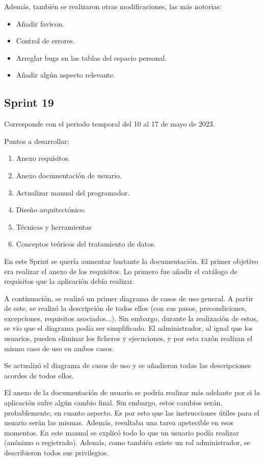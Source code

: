 Además, también se realizaron otras modificaciones, las más notorias:
\begin{itemize}
    \item Añadir favicon.
    \item Control de errores.
    \item Arreglar bugs en las tablas del espacio personal.
    \item Añadir algún aspecto relevante.
\end{itemize}


\subsection{Sprint 19}
Corresponde con el periodo temporal del 10 al 17 de mayo de 2023.

Puntos a desarrollar:
\begin{enumerate}
    \item Anexo requisitos.
    \item Anexo documentación de usuario.
    \item Actualizar manual del programador.
    \item Diseño arquitectónico.
    \item Técnicas y herramientas
    \item Conceptos teóricos del tratamiento de datos.
\end{enumerate}

En este Sprint se quería aumentar bastante la documentación. El primer objetivo
era realizar el anexo de los requisitos. Lo primero fue añadir el catálogo de
requisitos que la aplicación debía realizar.

A continuación, se realizó un primer diagrama de casos de uso general. A partir
de este, se realizó la descripción de todos ellos (con sus pasos,
precondiciones, excepciones, requisitos asociados...). Sin embargo, durante la
realización de estos, se vio que el diagrama podía ser simplificado. El
administrador, al igual que los usuarios, pueden eliminar los ficheros y
ejecuciones, y por esta razón realizan el mismo caso de uso en ambos casos. 

Se actualizó el diagrama de casos de uso y se añadieron todas las descripciones
acordes de todos ellos.

El anexo de la documentación de usuario se podría realizar más adelante por si
la aplicación sufre algún cambio final. Sin embargo, estos cambios serán,
probablemente, en cuanto aspecto. Es por esto que las instrucciones útiles para
el usuario serán las mismas. Además, resultaba una tarea apetecible en esos
momentos. En este manual se explicó todo lo que un usuario podía realizar
(anónimo o registrado). Además, como también existe un rol administrador, se
describieron todos sus privilegios.

